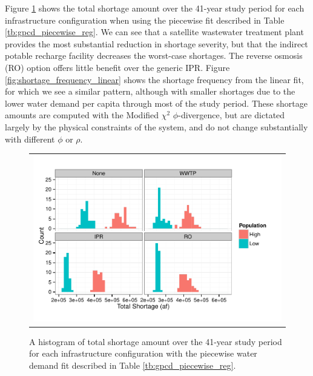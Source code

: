 \documentclass[opre,nonblindrev]{informs3} %
\begin{document}
Figure \ref{fig:shortage_frequency_piecewise} shows the total shortage amount over the 41-year study period for each infrastructure configuration when using the piecewise fit described in Table \ref{tb:gpcd_piecewise_reg}.
We can see that a satellite wastewater treatment plant provides the most substantial reduction in shortage severity, but that the indirect potable recharge facility decreases the worst-case shortages.
The reverse osmosis (RO) option offers little benefit over the generic IPR.
Figure \ref{fig:shortage_frequency_linear} shows the shortage frequency from the linear fit, for which we see a similar pattern, although with smaller shortages due to the lower water demand per capita through most of the study period.
These shortage amounts are computed with the Modified $\chi^2$ $\phi$-divergence, but are dictated largely by the physical constraints of the system, and do not change substantially with different $\phi$ or $\rho$.

\begin{figure}
	\FIGURE
	{%
		\begin{tabular}{c}
			\includegraphics*[width=.9\textwidth]{images/piecewise_shortage_frequency}%
		\end{tabular}
	}
	{
		A histogram of total shortage amount over the 41-year study period for each infrastructure configuration with the piecewise water demand fit described in Table \ref{tb:gpcd_piecewise_reg}.
		\label{fig:shortage_frequency_piecewise}
	}
	{}
\end{figure}
\end{document}

